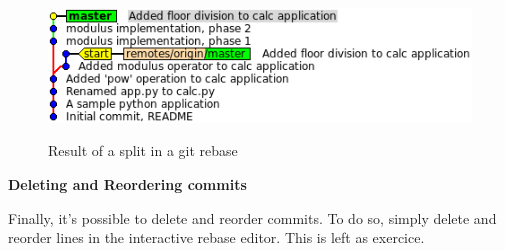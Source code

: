 \documentclass[a4paper]{../../common/tufte-latex/tufte-handout}
\begin{document}
\begin{figure}%
  \centering
  \includegraphics[width=0.75\linewidth]{gitrebase-split.png}
  \label{fig:gitrebase-split}
  \caption{Result of a split in a git rebase}
\end{figure}

\noindent \textbf{Deleting and Reordering commits}

Finally, it's possible to delete and reorder commits.
To do so, simply delete and reorder lines in the interactive rebase editor.
This is left as exercice.

%
%
\end{document}
